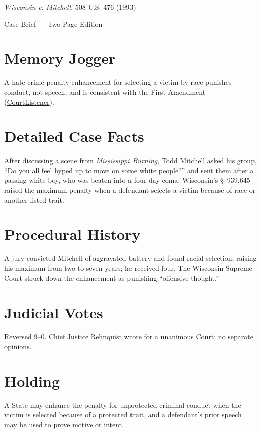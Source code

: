 \documentclass[12pt]{article}
\begin{document}
\begin{center}
{\LARGE \textit{Wisconsin v. Mitchell}, 508 U.S. 476 (1993)\par}
\vspace{0.5em}
{\large Case Brief --- Two-Page Edition\par}
\end{center}

\section{Memory Jogger}
A hate-crime penalty enhancement for selecting a victim by race punishes conduct, not speech, and is consistent with the First Amendment (\href{https://www.courtlistener.com/opinion/112879/wisconsin-v-mitchell/}{CourtListener}).

\section{Detailed Case Facts}
After discussing a scene from \textit{Mississippi Burning}, Todd Mitchell asked his group, ``Do you all feel hyped up to move on some white people?'' and sent them after a passing white boy, who was beaten into a four-day coma. Wisconsin's \S~939.645 raised the maximum penalty when a defendant selects a victim because of race or another listed trait.

\section{Procedural History}
A jury convicted Mitchell of aggravated battery and found racial selection, raising his maximum from two to seven years; he received four. The Wisconsin Supreme Court struck down the enhancement as punishing ``offensive thought.''

\section{Judicial Votes}
Reversed 9--0. Chief Justice Rehnquist wrote for a unanimous Court; no separate opinions.

\section{Holding}
A State may enhance the penalty for unprotected criminal conduct when the victim is selected because of a protected trait, and a defendant's prior speech may be used to prove motive or intent.
\end{document}
